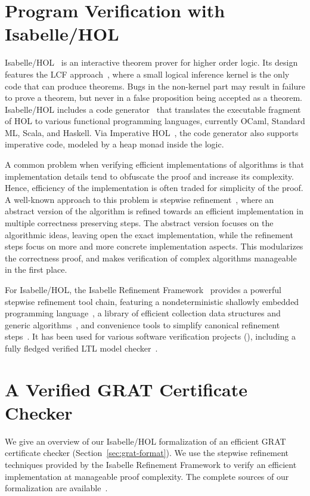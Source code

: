 \documentclass{llncs}
\begin{document}
\section{Program Verification with Isabelle/HOL}\label{sec:imp_ref_framework}
Isabelle/HOL~\cite{NPW02} is an interactive theorem prover for higher order logic. Its design features the LCF approach~\cite{Gord00}, where 
a small logical inference kernel is the only code that can produce theorems. Bugs in the non-kernel part may result in failure to 
prove a theorem, but never in a false proposition being accepted as a theorem.
Isabelle/HOL includes a code generator~\cite{Haft09,HaNi10,HKKN13} that translates the executable fragment of HOL to various functional programming languages, 
currently OCaml, Standard ML, Scala, and Haskell.
Via Imperative HOL~\cite{BKHEM08}, the code generator also supports imperative code, modeled by a heap monad inside the logic.

A common problem when verifying efficient implementations of algorithms is that implementation details tend to obfuscate the proof and increase its complexity. 
Hence, efficiency of the implementation is often traded for simplicity of the proof.
A well-known approach to this problem is stepwise refinement~\cite{Wirth71,Back78,BaWr98}, where an abstract version of the algorithm is refined towards 
an efficient implementation in multiple correctness preserving steps.
The abstract version focuses on the 
algorithmic ideas, leaving open the exact implementation, while the refinement steps focus on more and more concrete implementation aspects.
This modularizes the correctness proof, and makes verification of complex algorithms manageable in the first place.

For Isabelle/HOL, the Isabelle Refinement Framework~\cite{LaTu12,La13,La15,La16} provides a powerful stepwise refinement tool chain, 
featuring a nondeterministic shallowly embedded programming language~\cite{LaTu12}, a library of efficient collection data structures and generic algorithms~\cite{LL10,La15,La16},
and convenience tools to simplify canonical refinement steps~\cite{La13,La15}. It has been used for various software verification projects (\eg \cite{La14,LaSe16,LaNe15}), 
including a fully fledged verified LTL model checker~\cite{ELNN13,BrLa16}.

\section{A Verified GRAT Certificate Checker}\label{sec:grat_verified}
We give an overview of our Isabelle/HOL formalization of an efficient GRAT certificate checker (\cf Section~\ref{sec:grat-format}).
We use the stepwise refinement techniques provided by the Isabelle Refinement Framework to verify an efficient implementation at manageable proof complexity.
The complete sources of our formalization are available~\cite{??}. 
\end{document}

